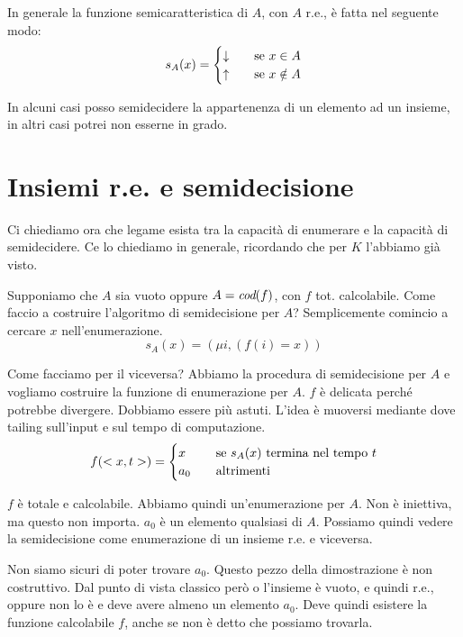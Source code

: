 In generale la funzione semicaratteristica di $A$, con $A$ r.e., è fatta nel seguente modo:
\begin{equation*}
    s_{A}(x) = 
    \begin{cases}
        \downarrow \quad &\text{se $x \in A$} \\
        \uparrow \quad &\text{se $x \notin A$}
    \end{cases}
\end{equation*}

In alcuni casi posso semidecidere la appartenenza di un elemento ad un insieme, in altri casi potrei
non esserne in grado.

\section{Insiemi r.e. e semidecisione}

Ci chiediamo ora che legame esista tra la capacità di enumerare e la capacità di semidecidere. Ce
lo chiediamo in generale, ricordando che per $K$ l'abbiamo già visto.

Supponiamo che $A$ sia vuoto oppure $A = \textit{cod}(f)$, con $f$ tot. calcolabile. Come faccio a costruire
l'algoritmo di semidecisione per $A$? Semplicemente comincio a cercare $x$ nell'enumerazione.
\begin{equation*}
    s_{A}(x) = (\mu i, (f(i) = x))
\end{equation*}

Come facciamo per il viceversa? Abbiamo la procedura di semidecisione per $A$ e vogliamo costruire la
funzione di enumerazione per $A$. $f$ è delicata perché potrebbe divergere. Dobbiamo essere più
astuti. L'idea è muoversi mediante dove tailing sull'input e sul tempo di computazione.
\begin{equation*}
    f(<x,t>) =
    \begin{cases}
        x \quad &\text{se $s_{A}(x)$ termina nel tempo $t$} \\
        a_{0} \quad &\text{altrimenti}
    \end{cases}
\end{equation*}

$f$ è totale e calcolabile. Abbiamo quindi un'enumerazione per $A$. Non è iniettiva, ma questo non
importa. $a_{0}$ è un elemento qualsiasi di $A$. Possiamo quindi vedere la semidecisione come
enumerazione di un insieme r.e. e viceversa.

Non siamo sicuri di poter trovare $a_{0}$. Questo pezzo della dimostrazione è non costruttivo. Dal
punto di vista classico però o l'insieme è vuoto, e quindi r.e., oppure non lo è e deve avere almeno
un elemento $a_{0}$. Deve quindi esistere la funzione calcolabile $f$, anche se non è detto che
possiamo trovarla.


